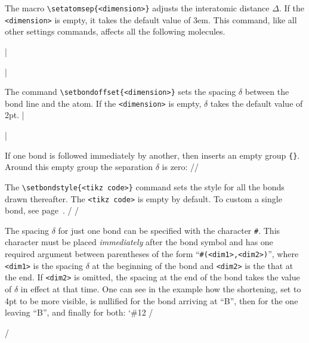 \documentclass[10pt]{article}
\begin{document}
\label{setatomsep}The macro \verb-\setatomsep{<dimension>}-\idx*{\setatomsep} adjusts the interatomic distance $\Delta$. If the \verb-<dimension>- is empty, it takes the default value of 3em. This command, like all other settings commands, affects all the following molecules. 

|\setatomsep{2em}\par
\setatomsep{50pt}|

\label{setbondoffset}\idx*{\setbondoffset}The command \verb-\setbondoffset{<dimension>}- sets the spacing $\delta$ between the bond line and the atom. If the \verb-<dimension>- is empty, $\delta$ takes the default value of 2pt.
|\setbondoffset{0pt}\par
	\setbondoffset{5pt}|

If one bond is followed immediately by another, then \CF inserts an empty group \verb-{}-. Around this empty group the separation $\delta$ is zero:
//

\label{setbondstyle}\idx*{\setbondstyle}The \verb-\setbondstyle{<tikz code>}- command sets the style for all the bonds drawn thereafter. The \verb-<tikz code>- is empty by default. To custom a single bond, see page~\pageref{perso-liaisons}.
/
/

\label{modif.retrait} The spacing $\delta$ for just one bond can be specified with the character \verb-#-. This character must be placed \emph{immediately} after the bond symbol and has one required argument between parentheses of the form ``\verb-#(<dim1>,<dim2>)-'', where \verb-<dim1>- is the spacing $\delta$ at the beginning of the bond and \verb-<dim2>- is the that at the end. If \verb-<dim2>- is omitted, the spacing at the end of the bond takes the value of $\delta$ in effect at that time. One can see in the example how the shortening, set to 4pt to be more visible, is nullified for the bond arriving at ``B'', then for the one leaving ``B'', and finally for both:
\begingroup
\catcode`\#12
/\setbondoffset{4pt}
\par
{}\par
{}\par
{}/
\endgroup
\end{document}
